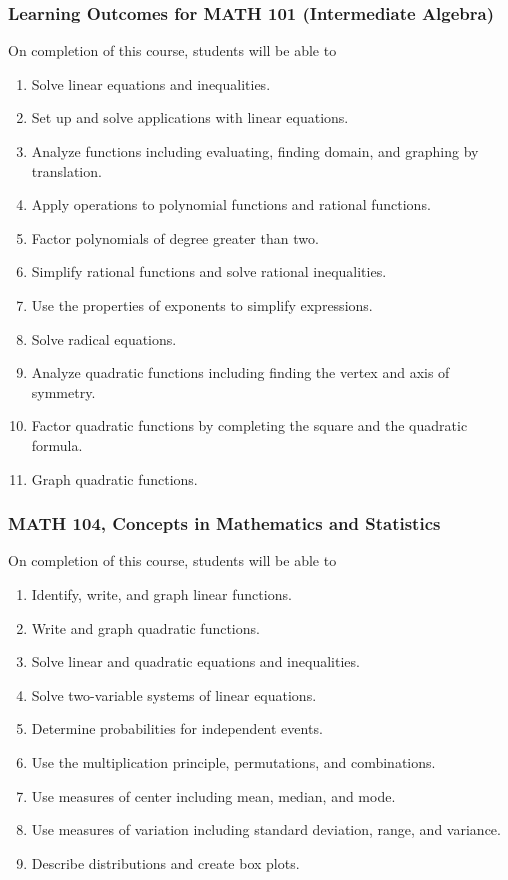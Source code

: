 \documentclass[11pt]{article}
\newenvironment{alphalist}{
\begin{enumerate}[label=(\arabic*),widest=107 ,leftmargin=25pt, itemsep=0pt]}
{\end{enumerate}}
\begin{document}
\subsubsection*{Learning Outcomes for MATH 101 (Intermediate Algebra)}

On completion of this course, students will  be able to 
\begin{alphalist}
\item  Solve linear equations and inequalities.
\item  Set up and solve applications with linear equations.
\item  Analyze functions including evaluating, finding domain, and graphing by translation.
\item  Apply operations to polynomial functions and rational functions.
\item  Factor polynomials of degree greater than two.
\item  Simplify rational functions and solve rational inequalities.
\item  Use the properties of exponents to simplify expressions.
\item  Solve radical equations.
\item  Analyze quadratic functions including finding the vertex and axis of symmetry.
\item Factor quadratic functions by completing the square and the quadratic formula.
\item  Graph quadratic functions.
\end{alphalist}
\subsubsection*{MATH 104,  Concepts in Mathematics and Statistics}


On completion of this course, students will be able to
\begin{alphalist}
    \item Identify, write, and graph linear functions.
    \item Write and graph quadratic functions.
    \item Solve linear and quadratic equations and inequalities.
    \item Solve two-variable systems of linear equations.
    \item Determine probabilities for independent events.
    \item Use the multiplication principle, permutations, and combinations.
    \item Use measures of center including mean, median, and mode.
    \item Use measures of variation including standard deviation, range, and variance.
    \item Describe distributions and create box plots.
\end{alphalist}
\end{document}
